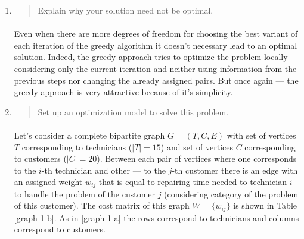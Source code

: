 \begin{enumerate}[(a)]
\begin{enumerate}[1.]
\item\begin{quote}Explain why your solution need not be optimal.\end{quote}

	\paragraph{}
	Even when there are more degrees of freedom for choosing the best variant of each iteration of the greedy algorithm it doesn't necessary lead to an optimal solution. Indeed, the greedy approach tries to optimize the problem locally --- considering only the current iteration and neither using information from the previous steps nor changing the already assigned pairs. But once again --- the greedy approach is very attractive because of it's simplicity.	

\item\begin{quote}Set up an optimization model to solve this problem.\end{quote}

	\paragraph{}
	Let's consider a complete bipartite graph $G=(T,C,E)$ with set of vertices $T$ corresponding to technicians ($|T|=15$) and set of vertices $C$ corresponding to customers ($|C|=20$). Between each pair of vertices where one corresponds to the $i$-th technician and other --- to the $j$-th customer there is an edge with an assigned weight $w_{ij}$ that is equal to repairing time needed to technician $i$ to handle the problem of the customer $j$ (considering category of the problem of this customer). The cost matrix of this graph $W=\{w_{ij}\}$ is shown in Table \ref{graph-1-b}. As in \ref{graph-1-a} the rows correspond to technicians and columns correspond to customers.


\end{enumerate}
\end{enumerate}
